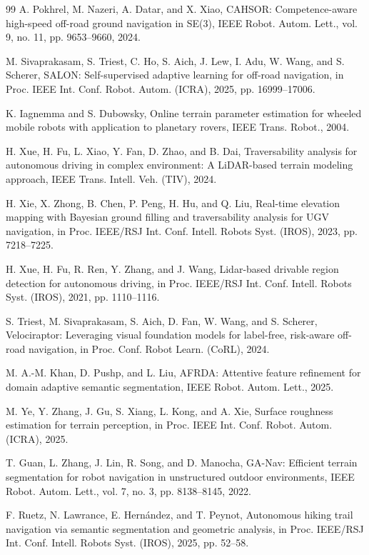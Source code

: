 \documentclass[letterpaper, 10 pt, conference]{ieeeconf}  %
\begin{document}
\begin{thebibliography}{99}
 A. Pokhrel, M. Nazeri, A. Datar, and X. Xiao, CAHSOR: Competence-aware high-speed off-road ground navigation in SE(3), IEEE Robot. Autom. Lett., vol. 9, no. 11, pp. 9653--9660, 2024.

 M. Sivaprakasam, S. Triest, C. Ho, S. Aich, J. Lew, I. Adu, W. Wang, and S. Scherer, SALON: Self-supervised adaptive learning for off-road navigation, in Proc. IEEE Int. Conf. Robot. Autom. (ICRA), 2025, pp. 16999--17006.

 K. Iagnemma and S. Dubowsky, Online terrain parameter estimation for wheeled mobile robots with application to planetary rovers, IEEE Trans. Robot., 2004.

 H. Xue, H. Fu, L. Xiao, Y. Fan, D. Zhao, and B. Dai, Traversability analysis for autonomous driving in complex environment: A LiDAR-based terrain modeling approach, IEEE Trans. Intell. Veh. (TIV), 2024.

 H. Xie, X. Zhong, B. Chen, P. Peng, H. Hu, and Q. Liu, Real-time elevation mapping with Bayesian ground filling and traversability analysis for UGV navigation, in Proc. IEEE/RSJ Int. Conf. Intell. Robots Syst. (IROS), 2023, pp. 7218--7225.

 H. Xue, H. Fu, R. Ren, Y. Zhang, and J. Wang, Lidar-based drivable region detection for autonomous driving, in Proc. IEEE/RSJ Int. Conf. Intell. Robots Syst. (IROS), 2021, pp. 1110--1116.

 S. Triest, M. Sivaprakasam, S. Aich, D. Fan, W. Wang, and S. Scherer, Velociraptor: Leveraging visual foundation models for label-free, risk-aware off-road navigation, in Proc. Conf. Robot Learn. (CoRL), 2024.

 M. A.-M. Khan, D. Pushp, and L. Liu, AFRDA: Attentive feature refinement for domain adaptive semantic segmentation, IEEE Robot. Autom. Lett., 2025.

 M. Ye, Y. Zhang, J. Gu, S. Xiang, L. Kong, and A. Xie, Surface roughness estimation for terrain perception, in Proc. IEEE Int. Conf. Robot. Autom. (ICRA), 2025.

 T. Guan, L. Zhang, J. Lin, R. Song, and D. Manocha, GA-Nav: Efficient terrain segmentation for robot navigation in unstructured outdoor environments, IEEE Robot. Autom. Lett., vol. 7, no. 3, pp. 8138--8145, 2022.

 F. Ruetz, N. Lawrance, E. Hernández, and T. Peynot, Autonomous hiking trail navigation via semantic segmentation and geometric analysis, in Proc. IEEE/RSJ Int. Conf. Intell. Robots Syst. (IROS), 2025, pp. 52--58.


\end{thebibliography}
\end{document}
